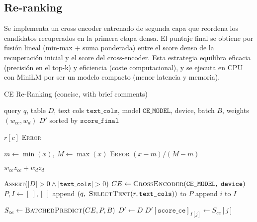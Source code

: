 \subsection{Re-ranking}\label{subsec:re-ranking}
Se implementa un cross encoder entrenado de segunda capa que reordena los candidatos recuperados en la primera etapa densa. El puntaje final se obtiene por fusión lineal (min-max + suma ponderada)
entre el score denso de la recuperación inicial y el score del cross-encoder. 
Esta estrategia equilibra eficacia (precisión en el top-k) y eficiencia (coste computacional), y se ejecuta en CPU con MiniLM por ser un modelo compacto (menor latencia y memoria).
\begin{algorithmEN}[H]
  \caption{CE Re-Ranking (concise, with brief comments)}
  \begin{algorithmic}[1]
    \Require query $q$, table $D$, text cols $\texttt{text\_cols}$, model $\texttt{CE\_MODEL}$, device, batch $B$, weights $(w_{ce},w_d)$
    \Ensure $D'$ sorted by $\texttt{score\_final}$

                      
         \Return $r[c]$ \EndIf
      \EndFor
      \State \textsc{Error}                         
    \EndFunction

                              
      \State $m\gets\min(x),\ M\gets\max(x)$
       \State \textsc{Error}           
      \EndIf
      \State \Return $(x-m)/(M-m)$
    \EndFunction

            
      \State \Return $w_{ce}z_{ce}+w_d z_d$
    \EndFunction

    \State \textsc{Assert}($|D|>0 \land |\texttt{text\_cols}|>0$) 
    \State $CE\gets\textsc{CrossEncoder}(\texttt{CE\_MODEL},\ \texttt{device})$ 
    \State $P,I\gets[\ ],[\ ]$                       
      \State append $(q,\ \Call{SelectText}{r,\texttt{text\_cols}})$ to $P$ 
      \State append $i$ to $I$                       
    \EndFor

    \State $S_{ce}\gets \textsc{BatchedPredict}(CE,P,B)$ 
    \State $D'\gets D$                               
     $D'[\texttt{score\_ce}]_{I[j]}\gets S_{ce}[j]$ \EndFor {}


\end{algorithmic}
\end{algorithmEN}
